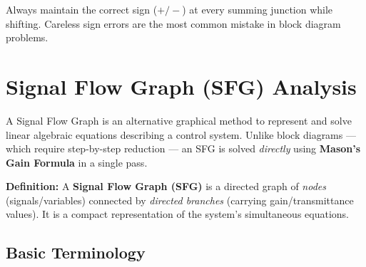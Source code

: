 \documentclass[12pt,a4paper]{article}
\begin{document}
\begin{tcolorbox}[exambox, title={Exam Tip}]
Always maintain the correct sign ($+/-$) at every summing junction while shifting. Careless sign errors are the most common mistake in block diagram problems.
\end{tcolorbox}

\section{Signal Flow Graph (SFG) Analysis}

A Signal Flow Graph is an alternative graphical method to represent and solve linear algebraic equations describing a control system. Unlike block diagrams — which require step-by-step reduction — an SFG is solved \textit{directly} using \textbf{Mason's Gain Formula} in a single pass.

\begin{tcolorbox}[masonbox]
\textbf{Definition:} A \textbf{Signal Flow Graph (SFG)} is a directed graph of \textit{nodes} (signals/variables) connected by \textit{directed branches} (carrying gain/transmittance values). It is a compact representation of the system's simultaneous equations.
\end{tcolorbox}

\subsection{Basic Terminology}
\end{document}
